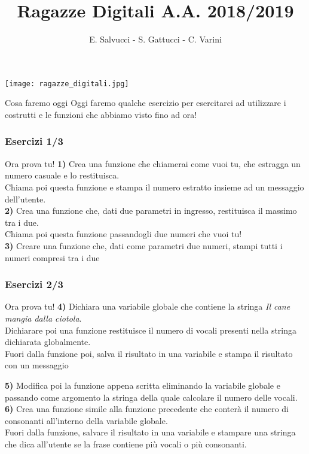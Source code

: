 \documentclass{beamer}
\title[Ragazze Digitali 2019]{Ragazze Digitali A.A. 2018/2019}
\author{E. Salvucci - S. Gattucci - C. Varini}
\date{}
\begin{document}
{\texttt{[image: ragazze\_digitali.jpg]}}
\begin{frame}
\end{frame}


\begin{frame}{Cosa faremo oggi}
    \vspace{0.8cm}
      Oggi faremo qualche esercizio per esercitarci ad utilizzare i costrutti e le funzioni che abbiamo visto fino ad ora!
\end{frame}


\begin{frame}[fragile]
\frametitle{Esercizi 1/3}
	\begin{block}{Ora prova tu!}
		\textbf{1)} Crea una funzione che chiamerai come vuoi tu, che estragga un numero casuale e lo restituisca.\\
		Chiama poi questa funzione e stampa il numero estratto insieme ad un messaggio dell'utente.\\
		\textbf{2)} Crea una funzione che, dati due parametri in ingresso, restituisca il massimo tra i due. \\
		Chiama poi questa funzione passandogli due numeri che vuoi tu!\\
		\textbf{3)} Creare una funzione che, dati come parametri due numeri, stampi tutti i numeri compresi tra i due\\

	\end{block}
\end{frame}

\begin{frame}[fragile]
\frametitle{Esercizi 2/3}
\begin{block}{Ora prova tu!}
	\textbf{4)} Dichiara una variabile globale che contiene la stringa \textit{Il cane mangia dalla ciotola}.\\ Dichiarare poi una funzione restituisce il numero di vocali presenti nella stringa dichiarata globalmente.\\
	Fuori dalla funzione poi, salva il risultato in una variabile e stampa il risultato con un messaggio

	\textbf{5)} Modifica poi la funzione appena scritta eliminando la variabile globale e passando come argomento la stringa della quale calcolare il numero delle vocali.\\
	\textbf{6)} Crea una funzione simile alla funzione precedente che conterà il numero di consonanti all'interno della variabile globale.\\
	Fuori dalla funzione, salvare il risultato in una variabile e stampare una stringa che dica all'utente se la frase contiene più vocali o più consonanti.\\
\end{block}
\end{frame}
\end{document}
